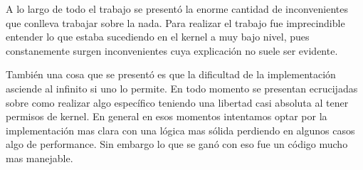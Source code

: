 	A lo largo de todo el trabajo se presentó la enorme cantidad de inconvenientes
que conlleva trabajar sobre la nada. Para realizar el trabajo fue imprecindible entender
lo que estaba sucediendo en el kernel a muy bajo nivel, pues constanemente surgen inconvenientes
cuya explicación no suele ser evidente.

	También una cosa que se presentó es que la dificultad de la implementación asciende al infinito
si uno lo permite. En todo momento se presentan ecrucijadas sobre como realizar algo específico teniendo
una libertad casi absoluta al tener permisos de kernel. En general en esos momentos intentamos optar
por la implementación mas clara con una lógica mas sólida perdiendo en algunos casos algo de performance.
Sin embargo lo que se ganó con eso fue un código mucho mas manejable.



